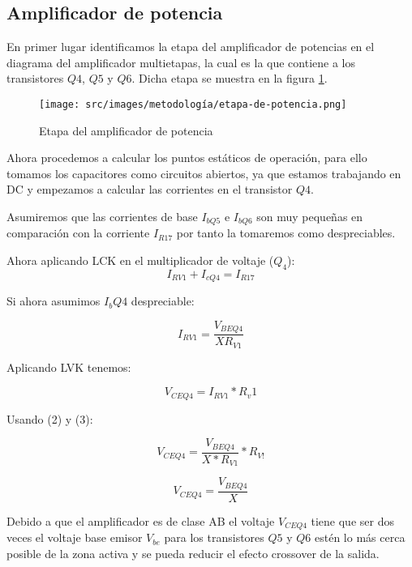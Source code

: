 \subsection{Amplificador de potencia}

En primer lugar identificamos la etapa del amplificador de potencias en el diagrama del amplificador multietapas, la cual es la que contiene a los transistores $Q4$, $Q5$ y $Q6$. Dicha etapa se muestra en la figura \ref{fig:met-etapa-amplificador-de-potencia}.

\begin{figure}[ht]
    \centering
    \texttt{[image: src/images/metodología/etapa-de-potencia.png]}
    \caption{Etapa del amplificador de potencia}
    \label{fig:met-etapa-amplificador-de-potencia}
\end{figure}

Ahora procedemos a calcular los puntos estáticos de operación, para ello tomamos los capacitores como circuitos abiertos, ya que estamos trabajando en DC y empezamos a calcular las corrientes en el transistor $Q4$.

Asumiremos que las corrientes de base $I_{bQ5}$ e $I_{bQ6}$ son muy pequeñas en comparación con la corriente $I_{R17}$ por tanto la tomaremos como despreciables.

Ahora aplicando LCK en el multiplicador de voltaje ($Q_4$):
\begin{equation}
I_{RV1} + I_{cQ4} = I_{R17}    
\end{equation}

Si ahora asumimos $I_bQ4$ despreciable:

\begin{equation}
    I_{RV1} = \frac{V_{BEQ4}}{XR_{V1}}
\end{equation}

Aplicando LVK tenemos:

\begin{equation}
    V_{CEQ4} = I_{RV1} * R_v1
\end{equation}

Usando (2) y (3):

$$ V_{CEQ4} = \frac{V_{BEQ4}}{X*R_{V1}} * R_{V!}$$

\begin{equation}
    V_{CEQ4} = \frac{V_{BEQ4}}{X}
\end{equation}

Debido a que el amplificador es de clase AB el voltaje $V_{CEQ4}$ tiene que ser dos veces el voltaje base emisor $V_{be}$ para los transistores $Q5$ y $Q6$ estén lo más cerca posible de la zona activa y se pueda reducir el efecto crossover de la salida.

